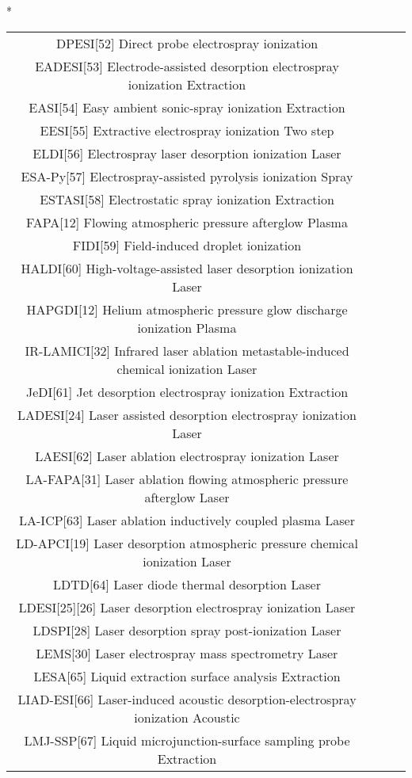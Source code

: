 \begin{table}{*}
\begin{tabular}{|c|c|c|l|}
DPESI[52] Direct probe electrospray ionization  \\
EADESI[53] Electrode-assisted desorption electrospray ionization Extraction \\
EASI[54] Easy ambient sonic-spray ionization Extraction \\
EESI[55] Extractive electrospray ionization Two step \\
ELDI[56] Electrospray laser desorption ionization Laser \\
ESA-Py[57] Electrospray-assisted pyrolysis ionization Spray \\
ESTASI[58] Electrostatic spray ionization Extraction \\
FAPA[12] Flowing atmospheric pressure afterglow Plasma \\
FIDI[59] Field-induced droplet ionization  \\
HALDI[60] High-voltage-assisted laser desorption ionization Laser \\
HAPGDI[12] Helium atmospheric pressure glow discharge ionization Plasma \\
IR-LAMICI[32] Infrared laser ablation metastable-induced chemical ionization Laser \\
JeDI[61] Jet desorption electrospray ionization Extraction \\
LADESI[24] Laser assisted desorption electrospray ionization Laser \\
LAESI[62] Laser ablation electrospray ionization Laser \\
LA-FAPA[31] Laser ablation flowing atmospheric pressure afterglow Laser \\
LA-ICP[63] Laser ablation inductively coupled plasma Laser \\
LD-APCI[19] Laser desorption atmospheric pressure chemical ionization Laser \\
LDTD[64] Laser diode thermal desorption Laser \\
LDESI[25][26] Laser desorption electrospray ionization Laser \\
LDSPI[28] Laser desorption spray post-ionization Laser \\ 
LEMS[30] Laser electrospray mass spectrometry Laser \\
LESA[65] Liquid extraction surface analysis Extraction \\
LIAD-ESI[66] Laser-induced acoustic desorption-electrospray ionization Acoustic \\
LMJ-SSP[67] Liquid microjunction-surface sampling probe Extraction \\

\end{tabular}
\end{table}

